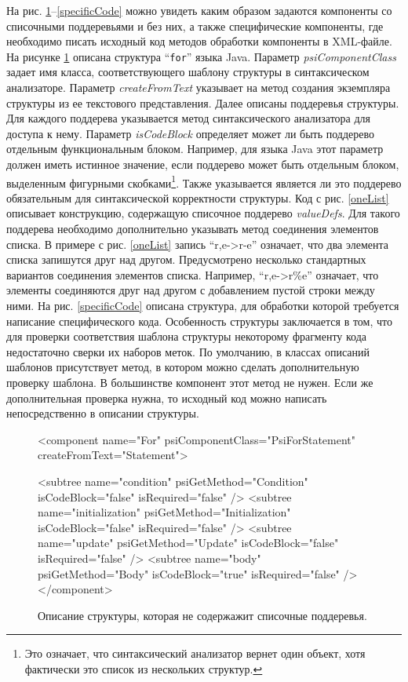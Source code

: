 \documentclass{matmex-diploma}
\begin{document}
На рис. \ref{noLists}--\ref{specificCode} можно увидеть каким образом задаются компоненты со списочными поддеревьями и без них, а также специфические компоненты, где необходимо писать исходный код методов обработки компоненты в XML-файле. На рисунке \ref{noLists} описана структура “\lstinline{for}” языка Java. Параметр \textit{psiComponentClass} задает имя класса, соответствующего шаблону структуры в синтаксическом анализаторе. Параметр \textit{createFromText} указывает на метод создания экземпляра структуры из ее текстового представления. Далее описаны поддеревья структуры. Для каждого поддерева указывается метод синтаксического анализатора для доступа к нему. Параметр \textit{isCodeBlock} определяет может ли быть поддерево отдельным функциональным блоком. Например, для языка Java этот параметр должен иметь истинное значение, если поддерево может быть отдельным блоком, выделенным фигурными скобками\footnote{Это означает, что синтаксический анализатор вернет один объект, хотя фактически это список из нескольких структур.}. Также указывается является ли это поддерево обязательным для синтаксической корректности структуры. Код с рис. \ref{oneList} описывает конструкцию, содержащую списочное поддерево \textit{valueDefs}. Для такого поддерева необходимо дополнительно указывать метод соединения элементов списка. В примере с рис. \ref{oneList} запись “r,e->r-e” означает, что два элемента списка запишутся друг над другом. Предусмотрено несколько стандартных вариантов соединения элементов списка. Например, “r,e->r\%e” означает, что элементы соединяются друг над другом с добавлением пустой строки между ними. На рис. \ref{specificCode} описана структура, для обработки которой требуется написание специфического кода. Особенность структуры заключается в том, что для проверки соответствия шаблона структуры некоторому фрагменту кода недостаточно сверки их наборов меток. По умолчанию, в классах описаний шаблонов присутствует метод, в котором можно сделать дополнительную проверку шаблона. В большинстве компонент этот метод не нужен. Если же дополнительная проверка нужна, то исходный код можно написать непосредственно в описании структуры.

\begin{figure}[H]
    \begin{pyglist}[language=xml,numbers=left,numbersep=5pt]
    <component 
        name="For"
        psiComponentClass="PsiForStatement" 
        createFromText="Statement">
        
        <subtree name="condition"       psiGetMethod="Condition"
                 isCodeBlock="false"    isRequired="false" />
        <subtree name="initialization"  psiGetMethod="Initialization"
                 isCodeBlock="false"    isRequired="false" />
        <subtree name="update"          psiGetMethod="Update"
                 isCodeBlock="false"    isRequired="false" />
        <subtree name="body"            psiGetMethod="Body"
                 isCodeBlock="true"     isRequired="false" />
    </component>
    \end{pyglist}
\caption{Описание структуры, которая не содержажит списочные поддеревья.}    
\label{noLists}
\end{figure}
\end{document}
